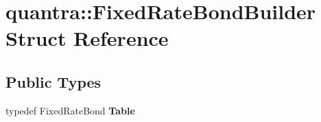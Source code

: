 \hypertarget{structquantra_1_1FixedRateBondBuilder}{}\section{quantra\+:\+:Fixed\+Rate\+Bond\+Builder Struct Reference}
\label{structquantra_1_1FixedRateBondBuilder}
\subsection*{Public Types}
\begin{DoxyCompactItemize}
\item 
\mbox{\label{structquantra_1_1FixedRateBondBuilder_a9d2deb8b37f8822aabc5284041381cd6}} 
typedef Fixed\+Rate\+Bond {\bfseries Table}
\end{DoxyCompactItemize}
